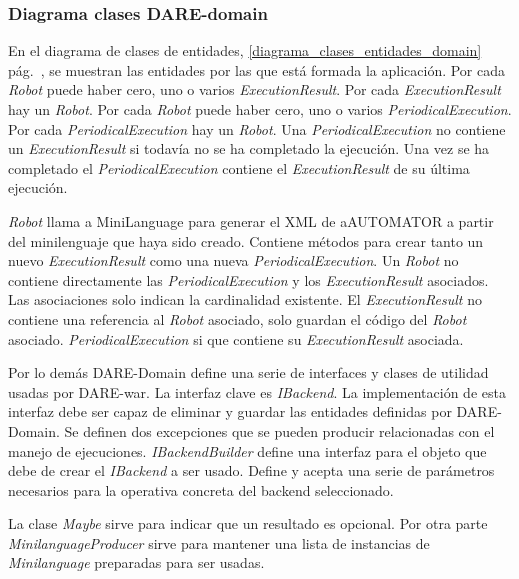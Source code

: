 \subsubsection{Diagrama clases DARE-domain}

En el diagrama de clases de entidades,
\ref{diagrama_clases_entidades_domain}
pág.~\pageref{diagrama_clases_entidades_domain}, se muestran las
entidades por las que está formada la aplicación. Por cada
\emph{Robot} puede haber cero, uno o varios
\emph{ExecutionResult}. Por cada \emph{ExecutionResult} hay un
\emph{Robot}. Por cada \emph{Robot} puede haber cero, uno o varios
\emph{PeriodicalExecution}. Por cada \emph{PeriodicalExecution} hay un
\emph{Robot}. Una \emph{PeriodicalExecution} no contiene un
\emph{ExecutionResult} si todavía no se ha completado la
ejecución. Una vez se ha completado el \emph{PeriodicalExecution}
contiene el \emph{ExecutionResult} de su última ejecución.

\emph{Robot} llama a MiniLanguage para generar el XML de aAUTOMATOR a
partir del minilenguaje que haya sido creado. Contiene métodos para
crear tanto un nuevo \emph{ExecutionResult} como una nueva
\emph{PeriodicalExecution}. Un \emph{Robot} no contiene directamente
las \emph{PeriodicalExecution} y los \emph{ExecutionResult}
asociados. Las asociaciones solo indican la cardinalidad existente. El
\emph{ExecutionResult} no contiene una referencia al \emph{Robot}
asociado, solo guardan el código del \emph{Robot}
asociado. \emph{PeriodicalExecution} si que contiene su
\emph{ExecutionResult} asociada.

Por lo demás DARE-Domain define una serie de interfaces y clases de
utilidad usadas por DARE-war. La interfaz clave es \emph{IBackend}. La
implementación de esta interfaz debe ser capaz de eliminar y guardar
las entidades definidas por DARE-Domain. Se definen dos excepciones
que se pueden producir relacionadas con el manejo de
ejecuciones. \emph{IBackendBuilder} define una interfaz para el objeto
que debe de crear el \emph{IBackend} a ser usado. Define y acepta una
serie de parámetros necesarios para la operativa concreta del backend
seleccionado.

La clase \emph{Maybe} sirve para indicar que un resultado es
opcional. Por otra parte \emph{MinilanguageProducer} sirve para mantener una
lista de instancias de \emph{Minilanguage} preparadas para ser
usadas.

